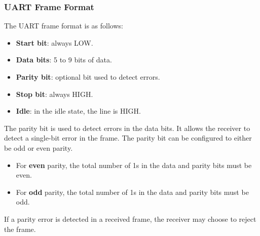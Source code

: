 \documentclass{report}
\begin{document}
\subsubsection{UART Frame Format}
The UART frame format is as follows:
\begin{itemize}
    \item \textbf{Start bit}: always LOW\@.
    \item \textbf{Data bits}: 5 to 9 bits of data\@.
    \item \textbf{Parity bit}: optional bit used to detect errors.
    \item \textbf{Stop bit}: always HIGH\@.
    \item \textbf{Idle}: in the idle state, the line is HIGH\@.
\end{itemize}
The parity bit is used to detect errors in the data bits. It allows the receiver to
detect a single-bit error in the frame. The parity bit can be configured to either be
odd or even parity.
\begin{itemize}
    \item For \textbf{even} parity, the total number of 1s in the data and parity bits must be even.
    \item For \textbf{odd} parity, the total number of 1s in the data and parity bits must be odd.
\end{itemize}
If a parity error is detected in a received frame, the receiver may choose to reject the frame.
\end{document}
